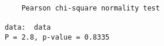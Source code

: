 \begin{verbatim} 

	Pearson chi-square normality test

data:  data
P = 2.8, p-value = 0.8335

\end{verbatim}